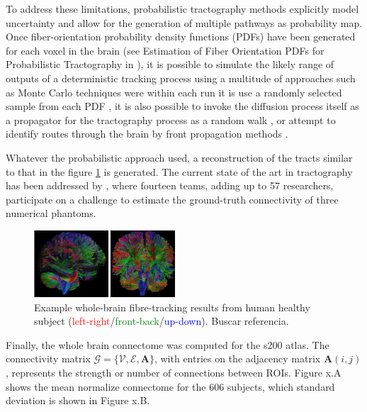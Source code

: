\documentclass{cys}
\begin{document}
\bigskip
To address these limitations, probabilistic tractography methods explicitly model uncertainty and allow for the generation of multiple pathways as probability map. Once ﬁber-orientation probability density functions (PDFs) have been generated for each voxel in the brain (see Estimation of Fiber Orientation PDFs for Probabilistic Tractography in \cite{jones2010diffusion}), it is possible to simulate the likely range of outputs of a deterministic tracking process using a multitude of approaches such as Monte Carlo techniques were within each run it is use a randomly selected sample from each PDF \cite{parker2005probabilistic}, it is also possible to invoke the diffusion process itself as a propagator for the tractography process as a random walk \cite{koch2002investigation}, or attempt to identify routes through the brain by front propagation methods \cite{campbell2005flow}.  

\bigskip
Whatever the probabilistic approach used, a reconstruction of the tracts similar to that in the figure \ref{FullBrainTractography} is generated. The current state of the art in tractography has been addressed by \cite{girard2023tractography}, where fourteen teams, adding up to 57 researchers, participate on a challenge to estimate the ground-truth connectivity of three numerical phantoms.

\begin{figure}[H]
\centering
	\includegraphics[width=0.47\textwidth]{FullBrainTractography}
	\caption{Example whole-brain fibre-tracking results from human healthy subject (\textcolor{red}{left-right}/\textcolor{green}{front-back}/\textcolor{blue}{up-down}). Buscar referencia.}
	\label{FullBrainTractography}
\end{figure}

Finally, the whole brain connectome was computed for the s200 atlas. The connectivity matrix $\mathcal{G}=\{\mathcal{V},\mathcal{E},\mathbf{A}\}$, with entries on the adjacency matrix $\mathbf{A}(i,j)$, represents the strength or number of connections between ROIs. Figure x.A shows the mean normalize connectome for the 606 subjects, which standard deviation is shown in Figure x.B. 
\end{document}
